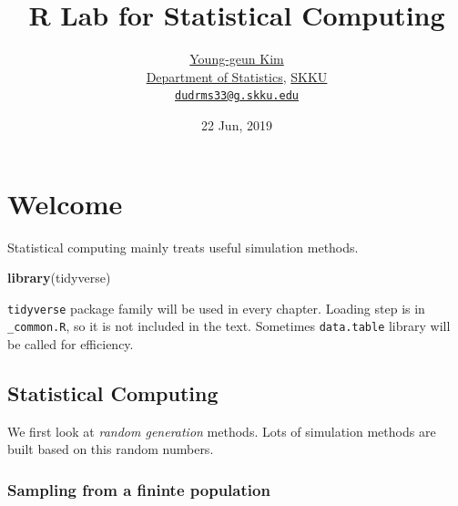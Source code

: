 \documentclass[]{book}
\title{R Lab for Statistical Computing}
\author{\href{https://github.com/ygeunkim}{Young-geun Kim}\\
\href{https://stat.skku.edu/stat/index.jsp}{Department of Statistics}, \href{https://www.skku.edu/skku/index.do}{SKKU}\\
\href{mailto:dudrms33@g.skku.edu}{\nolinkurl{dudrms33@g.skku.edu}}}
\date{22 Jun, 2019}
\newenvironment{Shaded}{\begin{snugshade}}{\end{snugshade}}
\newcommand{\KeywordTok}[1]{\textcolor[rgb]{0.13,0.29,0.53}{\textbf{#1}}}
\newcommand{\NormalTok}[1]{#1}
\let\oldmaketitle\maketitle
\theoremstyle{definition}
\theoremstyle{definition}
\theoremstyle{definition}
\theoremstyle{remark}
\begin{document}
\maketitle

\begin{titlepage}
  
\end{titlepage}

\let\maketitle\oldmaketitle
\maketitle

{
\setcounter{tocdepth}{1}
\tableofcontents
}
\hypertarget{welcome}{%
\chapter*{Welcome}\label{welcome}}

Statistical computing mainly treats useful simulation methods.

\begin{Shaded}
\begin{Highlighting}[]
\KeywordTok{library}\NormalTok{(tidyverse)}
\end{Highlighting}
\end{Shaded}

\texttt{tidyverse} package family will be used in every chapter. Loading step is in \texttt{\_common.R}, so it is not included in the text. Sometimes \texttt{data.table} library will be called for efficiency.

\hypertarget{statistical-computing}{%
\section*{Statistical Computing}\label{statistical-computing}}

We first look at \emph{random generation} methods. Lots of simulation methods are built based on this random numbers.

\hypertarget{sampling-from-a-fininte-population}{%
\subsection*{Sampling from a fininte population}\label{sampling-from-a-fininte-population}}
\end{document}
